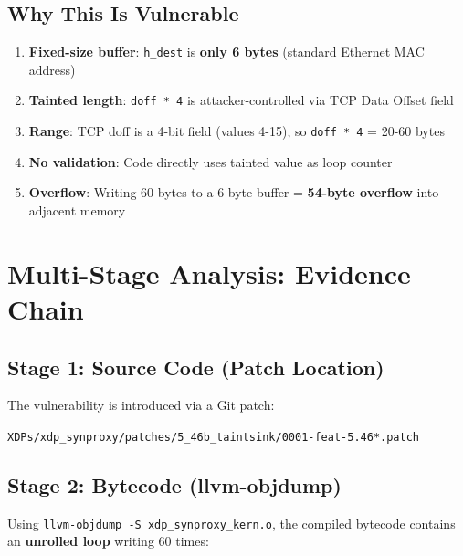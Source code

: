 \subsection{Why This Is Vulnerable}

\begin{enumerate}[label=\arabic*.]
  \item \textbf{Fixed-size buffer}: \texttt{h\_dest} is \textbf{only 6 bytes} (standard Ethernet MAC address)
  \item \textbf{Tainted length}: \texttt{doff * 4} is attacker-controlled via TCP Data Offset field
  \item \textbf{Range}: TCP doff is a 4-bit field (values 4-15), so \texttt{doff * 4} = 20-60 bytes
  \item \textbf{No validation}: Code directly uses tainted value as loop counter
  \item \textbf{Overflow}: Writing 60 bytes to a 6-byte buffer = \textbf{54-byte overflow} into adjacent memory
\end{enumerate}

\section{Multi-Stage Analysis: Evidence Chain}

\subsection{Stage 1: Source Code (Patch Location)}

The vulnerability is introduced via a Git patch:
\begin{tcolorbox}[colback=gray!10, colframe=gray!10, arc=2pt, boxrule=0pt]
\small\ttfamily
\texttt{XDPs/xdp\_synproxy/patches/5\_46b\_taintsink/0001-feat-5.46*.patch}
\end{tcolorbox}

\subsection{Stage 2: Bytecode (llvm-objdump)}

Using \texttt{llvm-objdump -S xdp\_synproxy\_kern.o}, the compiled bytecode contains an \textbf{unrolled loop} writing 60 times:

\vspace{0.3cm}
\noindent
{}
\vspace{0.3cm}

